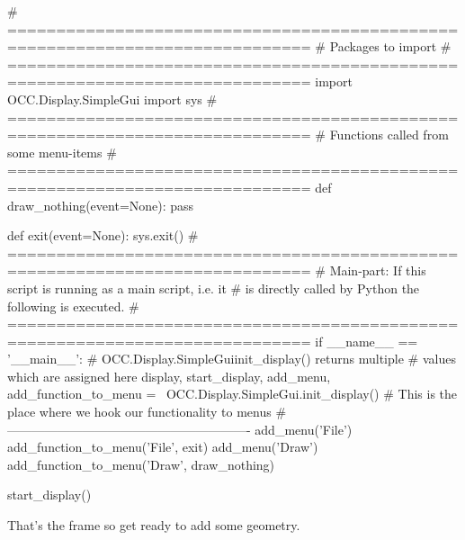 \pagebreak
\begin{python}[moreemph={[4], 46, 48},caption={Step1.py - The program frame},label=LISTING_STEP1_PY]
# =============================================================================
# Packages to import
# =============================================================================
import OCC.Display.SimpleGui 
import sys
# =============================================================================
# Functions called from some menu-items
# =============================================================================
def draw_nothing(event=None):
    pass

def exit(event=None):
    sys.exit()
# =============================================================================
# Main-part: If this script is running as a main script, i.e. it 
# is directly called by Python the following is executed.
# =============================================================================
if __name__ == '__main__':
    # OCC.Display.SimpleGuiinit_display() returns multiple
    # values which are assigned here
    display, start_display, add_menu, add_function_to_menu = \
        OCC.Display.SimpleGui.init_display()
    # This is the place where we hook our functionality to menus
    # ----------------------------------------------------------
    add_menu('File')
    add_function_to_menu('File',  exit)
    add_menu('Draw')
    add_function_to_menu('Draw', draw_nothing)
    
    start_display()
\end{python}

That's the frame so get ready to add some geometry.
